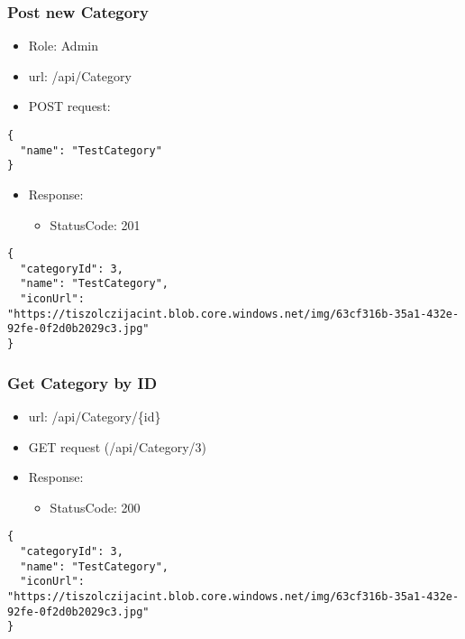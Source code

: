 \documentclass[11pt]{article}
\begin{document}
\subsubsection{Post new Category}
\label{sec:orgd4359c8}
\begin{itemize}
\item Role: Admin
\item url: /api/Category
\item POST request:
\end{itemize}
\begin{verbatim}
{
  "name": "TestCategory"
}
\end{verbatim}
\begin{itemize}
\item Response:
\begin{itemize}
\item StatusCode: 201
\end{itemize}
\end{itemize}
\begin{verbatim}
{
  "categoryId": 3,
  "name": "TestCategory",
  "iconUrl": "https://tiszolczijacint.blob.core.windows.net/img/63cf316b-35a1-432e-92fe-0f2d0b2029c3.jpg"
}
\end{verbatim}
\subsubsection{Get Category by ID}
\label{sec:org127b22a}
\begin{itemize}
\item url: /api/Category/\{id\}
\item GET request (/api/Category/3)
\item Response:
\begin{itemize}
\item StatusCode: 200
\end{itemize}
\end{itemize}
\begin{verbatim}
{
  "categoryId": 3,
  "name": "TestCategory",
  "iconUrl": "https://tiszolczijacint.blob.core.windows.net/img/63cf316b-35a1-432e-92fe-0f2d0b2029c3.jpg"
}
\end{verbatim}
\end{document}
